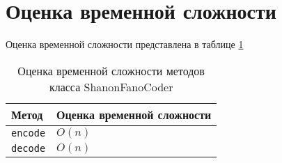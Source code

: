 \section{Оценка временной сложности}

Оценка временной сложности представлена в таблице \ref{tab:complexity}

\begin{table}[H]
    \centering
    \begin{tabular}{|l|l|}
        \hline
        Метод & Оценка временной сложности \\
        \hline
        \verb|encode| & $ O(n) $ \\
        \hline
        \verb|decode| & $ O(n) $ \\
        \hline
    \end{tabular}
    \caption{Оценка временной сложности методов класса ShanonFanoCoder}
    \label{tab:complexity}
\end{table}
